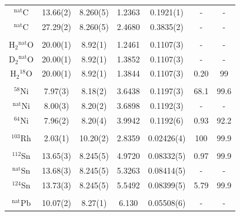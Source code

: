\begin{table}[tb]
\begin{center}
\begin{tabular}{ c c c c c c c }
            $^{\text{nat}}$C & 13.66(2) & 8.260(5) & 1.2363
            & 0.1921(1) & - & -\\
            $^{\text{nat}}$C & 27.29(2) & 8.260(5) & 2.4680
            & 0.3835(2) & - & -\\
            \\
            H$_{2}$$^{\text{nat}}$O & 20.00(1) & 8.92(1) & 1.2461 & 0.1107(3) & - &
            - \\
            D$_{2}$$^{\text{nat}}$O & 20.00(1) & 8.92(1) & 1.3852 & 0.1107(3) & - &
            - \\
            H$_{2}$$^{18}$O & 20.00(1) & 8.92(1) & 1.3844 & 0.1107(3) & 0.20 & 99\\
            \\
            $^{58}$Ni & 7.97(3)& 8.18(2) &
            3.6438 & 0.1197(3)& 68.1 & 99.6 \\
            $^{\text{nat}}$Ni & 8.00(3) & 8.20(2) &
            3.6898 & 0.1192(3)& - & -\\
            $^{64}$Ni & 7.96(2) & 8.20(4) &
            3.9942 & 0.1192(6) & 0.93 & 92.2\\
            \\
            $^{103}$Rh & 2.03(1) & 10.20(2) & 2.8359 & 0.02426(4) & 100 & 99.9\\
            \\
            $^{112}$Sn & 13.65(3) & 8.245(5) &
            4.9720 & 0.08332(5) & 0.97 & 99.9\\
            $^{\text{nat}}$Sn & 13.68(3) & 8.245(5) &
            5.3263 & 0.08414(5) & - & -\\
            $^{124}$Sn & 13.73(3) & 8.245(5) &
            5.5492 & 0.08399(5) & 5.79 & 99.9\\
            \\
            $^{\text{nat}}$Pb & 10.07(2) & 8.27(1) & 6.130 &
            0.05508(6) & - & -\\
            \bottomrule
        \end{tabular}
    \end{center}
\end{table}
